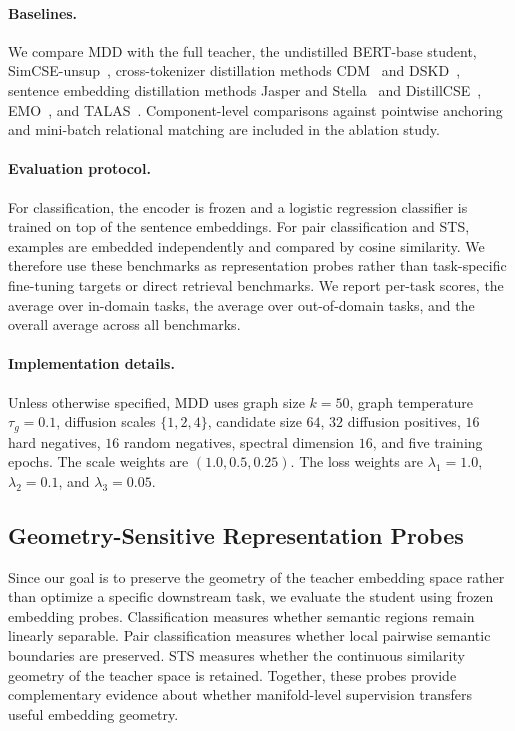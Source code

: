 \paragraph{Baselines.}
We compare MDD with the full teacher, the undistilled BERT-base student, SimCSE-unsup~\citep{gao2021simcse}, cross-tokenizer distillation methods CDM~\citep{chen2025cdm} and DSKD~\citep{zhang2024dskd}, sentence embedding distillation methods Jasper and Stella~\citep{zhang2024jasperstella} and DistillCSE~\citep{gao2021distilcse,xu2023distillcse}, EMO~\citep{truong2025emo}, and TALAS~\citep{dao2026talas}. Component-level comparisons against pointwise anchoring and mini-batch relational matching are included in the ablation study.

\paragraph{Evaluation protocol.}
For classification, the encoder is frozen and a logistic regression classifier is trained on top of the sentence embeddings. For pair classification and STS, examples are embedded independently and compared by cosine similarity. We therefore use these benchmarks as representation probes rather than task-specific fine-tuning targets or direct retrieval benchmarks. We report per-task scores, the average over in-domain tasks, the average over out-of-domain tasks, and the overall average across all benchmarks.

\paragraph{Implementation details.}
Unless otherwise specified, MDD uses graph size $k=50$, graph temperature $\tau_g=0.1$, diffusion scales $\{1,2,4\}$, candidate size $64$, $32$ diffusion positives, $16$ hard negatives, $16$ random negatives, spectral dimension $16$, and five training epochs. The scale weights are $(1.0,0.5,0.25)$. The loss weights are $\lambda_1=1.0$, $\lambda_2=0.1$, and $\lambda_3=0.05$.

\subsection{Geometry-Sensitive Representation Probes}

Since our goal is to preserve the geometry of the teacher embedding space rather than optimize a specific downstream task, we evaluate the student using frozen embedding probes. Classification measures whether semantic regions remain linearly separable. Pair classification measures whether local pairwise semantic boundaries are preserved. STS measures whether the continuous similarity geometry of the teacher space is retained. Together, these probes provide complementary evidence about whether manifold-level supervision transfers useful embedding geometry.

